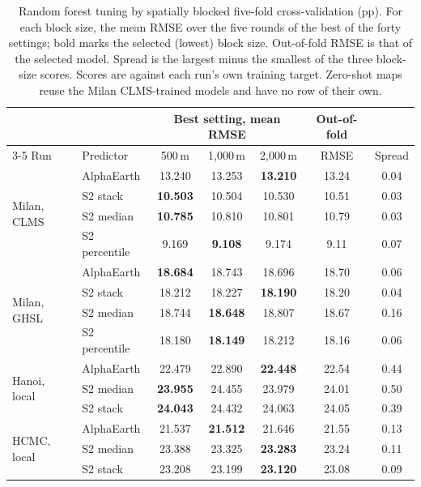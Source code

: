 \begin{table}[htbp]
  \centering
  \small
  \caption{Random forest tuning by spatially blocked five-fold
  cross-validation (pp). For each block size, the mean RMSE over the five
  rounds of the best of the forty settings; bold marks the selected
  (lowest) block size. Out-of-fold RMSE is that of the selected model.
  Spread is the largest minus the smallest of the three block-size scores.
  Scores are against each run's own training target. Zero-shot maps reuse
  the Milan CLMS-trained models and have no row of their own.}
  \label{tab:cv}
  \begin{tabular}{llccccc}
    \toprule
    & & \multicolumn{3}{c}{Best setting, mean RMSE} & Out-of-fold & \\
    \cmidrule(lr){3-5}
    Run & Predictor & 500\,m & 1{,}000\,m & 2{,}000\,m & RMSE & Spread \\
    \midrule
    \multirow{4}{*}{Milan, CLMS}
      & AlphaEarth    & 13.240 & 13.253 & \textbf{13.210} & 13.24 & 0.04 \\
      & S2 stack      & \textbf{10.503} & 10.504 & 10.530 & 10.51 & 0.03 \\
      & S2 median     & \textbf{10.785} & 10.810 & 10.801 & 10.79 & 0.03 \\
      & S2 percentile & 9.169 & \textbf{9.108} & 9.174 & 9.11 & 0.07 \\
    \midrule
    \multirow{4}{*}{Milan, GHSL}
      & AlphaEarth    & \textbf{18.684} & 18.743 & 18.696 & 18.70 & 0.06 \\
      & S2 stack      & 18.212 & 18.227 & \textbf{18.190} & 18.20 & 0.04 \\
      & S2 median     & 18.744 & \textbf{18.648} & 18.807 & 18.67 & 0.16 \\
      & S2 percentile & 18.180 & \textbf{18.149} & 18.212 & 18.16 & 0.06 \\
    \midrule
    \multirow{3}{*}{Hanoi, local}
      & AlphaEarth    & 22.479 & 22.890 & \textbf{22.448} & 22.54 & 0.44 \\
      & S2 median     & \textbf{23.955} & 24.455 & 23.979 & 24.01 & 0.50 \\
      & S2 stack      & \textbf{24.043} & 24.432 & 24.063 & 24.05 & 0.39 \\
    \midrule
    \multirow{3}{*}{HCMC, local}
      & AlphaEarth    & 21.537 & \textbf{21.512} & 21.646 & 21.55 & 0.13 \\
      & S2 median     & 23.388 & 23.325 & \textbf{23.283} & 23.24 & 0.11 \\
      & S2 stack      & 23.208 & 23.199 & \textbf{23.120} & 23.08 & 0.09 \\
    \bottomrule
  \end{tabular}
\end{table}

